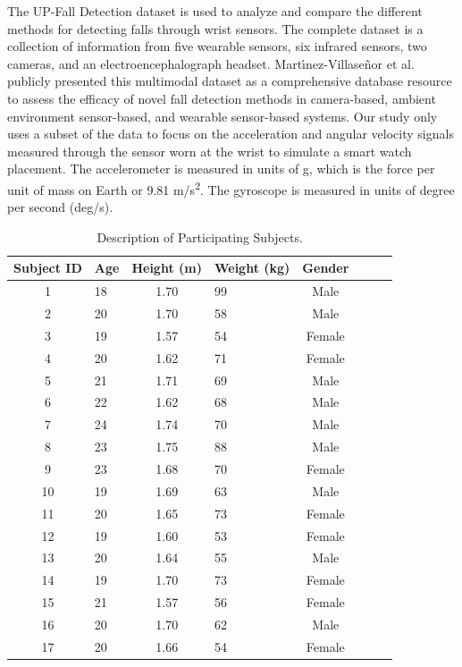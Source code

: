 \documentclass{llncs}
\begin{document}
The UP-Fall Detection dataset is used to analyze and compare the different methods for detecting falls through wrist sensors. The complete dataset is a collection of information from five wearable sensors, six infrared sensors, two cameras, and an electroencephalograph headset. Mart{\'\i}nez-Villase{\~n}or et al. publicly presented this multimodal dataset as a comprehensive database resource to assess the efficacy of novel fall detection methods in camera-based, ambient environment sensor-based, and wearable sensor-based systems.\cite{martinez2019up} Our study only uses a subset of the data to focus on the acceleration and angular velocity signals measured through the sensor worn at the wrist to simulate a smart watch placement. The accelerometer is measured in units of g, which is the force per unit of mass on Earth or 9.81 m/s\textsuperscript{2}. The gyroscope is measured in units of degree per second (deg/s).
 
\begin{table}
	\begin{center}
		\caption{Description of Participating Subjects.}\label{table1}
		\begin{tabular}{clclclc|c}
			\toprule
			Subject ID & Age & Height (m) & Weight (kg) & Gender\\
			\midrule
			1 &  18 & 1.70 & 99 & Male\\
			2 &  20 & 1.70 & 58 & Male\\
			3 & 19 & 1.57 & 54 & Female\\
			4 & 20 & 1.62 & 71 & Female\\
			5 & 21 & 1.71 & 69 & Male\\
			6 & 22 & 1.62 & 68 & Male\\
			7 & 24 & 1.74 & 70 & Male\\
			8 & 23 & 1.75 & 88 & Male\\
			9 & 23 & 1.68 & 70 & Female\\
			10 & 19 & 1.69 & 63 & Male\\
			11 & 20 & 1.65 & 73 & Female\\
			12 & 19 & 1.60 & 53 & Female\\
			13 & 20 & 1.64 & 55 & Male\\
			14 & 19 & 1.70 & 73 & Female\\
			15 & 21 & 1.57 & 56 & Female\\
			16 & 20 & 1.70 & 62 & Male\\
			17 & 20 & 1.66 & 54 & Female\\
			\bottomrule
		\end{tabular}
	\end{center}
\end{table}
\end{document}
